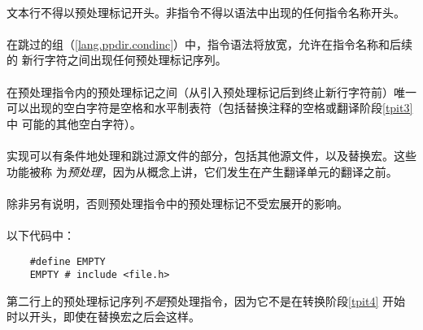 {\paragraph{}
文本行不得以\tm{\#}预处理标记开头。非指令不得以语法中出现的任何指令名称开头。

\paragraph{}
在跳过的组（\ref{lang.ppdir.condinc}）中，指令语法将放宽，允许在指令名称和后续的
新行字符之间出现任何预处理标记序列。

\constraint
\paragraph{}
在预处理指令内的预处理标记之间（从引入预处理标记\tm{\#}后到终止新行字符前）唯一
可以出现的空白字符是空格和水平制表符（包括替换注释的空格或翻译阶段\ref{tpit3}中
可能的其他空白字符）。

\semantic
\paragraph{}
实现可以有条件地处理和跳过源文件的部分，包括其他源文件，以及替换宏。这些功能被称
为\textit{预处理}，因为从概念上讲，它们发生在产生翻译单元的翻译之前。

\paragraph{}
除非另有说明，否则预处理指令中的预处理标记不受宏展开的影响。

\paragraph{}
\ex* 以下代码中：
\begin{lstlisting}
    #define EMPTY
    EMPTY # include <file.h>
\end{lstlisting}
第二行上的预处理标记序列\textit{不是}预处理指令，因为它不是在转换阶段\ref{tpit4}
开始时以\tm{\#}开头，即使在替换宏之后会这样。

\constraint
}
